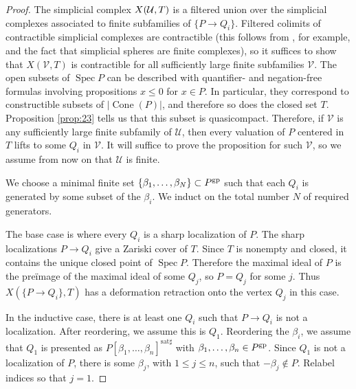\documentclass[10pt]{article}
\numberwithin{equation}{section}
\theoremstyle{definition}
\theoremstyle{remark}
\def\Cone{\operatorname{Cone}}
\def\Spec{\operatorname{Spec}}
\def\spec{\Spec}
\begin{document}
\begin{proof}
	The simplicial complex $X({\cal U}, T)$ is a filtered union over the simplicial complexes associated to finite subfamilies of $\{P \to Q_i\}$. Filtered colimits of contractible simplicial complexes are contractible (this follows from \cite[\href{https://kerodon.net/tag/00ZE}{Tag 00ZE}]{kerodon}, for example, and the fact that simplicial spheres are finite complexes), so it suffices to show that $X(\mathcal V, T)$ is contractible for all sufficiently large finite subfamilies $\mathcal V$.  The open subsets of $\spec P$ can be described with quantifier- and negation-free formulas involving propositions $x \leq 0$ for $x \in P$.  In particular, they correspond to constructible subsets of $\lvert\Cone(P)\rvert$, and therefore so does the closed set $T$.  Proposition \ref{prop:23} tells us that this subset is quasicompact.  Therefore, if $\mathcal V$ is any sufficiently large finite subfamily of $\mathcal U$, then every valuation of $P$ centered in $T$ lifts to some $Q_i$ in $\mathcal V$.  It will suffice to prove the proposition for such $\mathcal V$, so we assume from now on that $\mathcal U$ is finite.



	


	



	

	We choose a minimal finite set $\{ \beta_1, \ldots, \beta_N \} \subset P^{\rm gp}$ such that each $Q_i$ is generated by some subset of the $\beta_i$.  We induct on the total number $N$ of required generators. 





	The base case is where every $Q_i$ is a sharp localization of $P$.  The sharp localizations $P \to Q_i$ give a Zariski cover of $T$.  Since $T$ is nonempty and closed, it contains the unique closed point of $\spec P$.  Therefore the maximal ideal of $P$ is the pre\"image of the maximal ideal of some $Q_j$, so $P = Q_j$ for some $j$.  Thus $X(\{ P \to Q_i \}, T)$ has a deformation retraction onto the vertex $Q_j$ in this case.





	In the inductive case, there is at least one $Q_i$ such that $P \to Q_i$ is not a localization.  After reordering, we assume this is $Q_1$.  Reordering the $\beta_i$, we assume that $Q_1$ is presented as $P[\beta_{1}, \ldots, \beta_{n}]^{\mathrm{sat}\sharp}$ with $\beta_{1}, \ldots, \beta_{n} \in P^{\rm gp}$.  Since $Q_1$ is not a localization of $P$, there is some $\beta_j$, with $1 \leq j \leq n$, such that $-\beta_j \not\in P$.  Relabel indices so that $j = 1$.






\end{proof}
\end{document}
